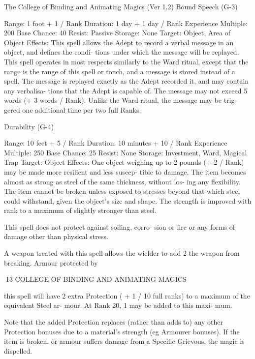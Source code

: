 \begin{Chapter}{The College of Binding and Animating Magics (Ver 1.2)}
Bound Speech (G-3) 

Range: 1 foot + 1 / Rank 
Duration: 1 day + 1 day / Rank 
Experience Multiple: 200 
Base Chance: 40%
Resist: Passive 
Storage: None 
Target: Object, Area of Object 
Effects:  This  spell  allows  the  Adept  to  record  a 
verbal message in an object, and defines the condi-
tions  under  which  the  message  will  be  replayed. 
This spell operates in most respects similarly to the 
Ward  ritual,  except  that  the  range  is  the  range  of 
this spell or touch, and a message is stored instead 
of  a  spell.  The  message  is  replayed  exactly  as  the 
Adept  recorded  it,  and  may  contain any  verbalisa-
tions  that  the  Adept  is  capable  of.  The  message 
may  not  exceed  5  words  (+  3  words  /  Rank). 
Unlike  the  Ward  ritual,  the  message  may  be  trig-
gered one additional time per two full Ranks. 

Durability (G-4) 

Range: 10 feet + 5 / Rank 
Duration: 10 minutes + 10 / Rank 
Experience Multiple: 250 
Base Chance: 25%
Resist: None 
Storage: Investment, Ward, Magical Trap 
Target: Object 
Effects: One object weighing up to 2 pounds (+ 2 / 
Rank) may be made more resilient and less suscep-
tible  to  damage.  The  item  becomes  almost  as 
strong  as  steel  of  the  same  thickness,  without  los-
ing  any  flexibility.  The  item  cannot  be  broken 
unless exposed to stresses beyond that which steel 
could withstand, given the object’s size and shape. 
The strength is improved with rank to a maximum 
of slightly stronger than steel. 

This  spell  does  not  protect  against  soiling,  corro-
sion  or  fire  or  any  forms  of  damage  other  than 
physical stress. 

A weapon treated with this spell allows the wielder 
to add 2%
the  weapon  from  breaking.  Armour  protected  by 

13 COLLEGE OF BINDING AND ANIMATING MAGICS 

this spell will have 2 extra Protection ( + 1 / 10 full 
ranks)  to  a  maximum  of  the  equivalent  Steel  ar-
mour.  At  Rank  20,  1  may  be  added  to  this  maxi-
mum. 

Note that the added Protection replaces (rather than 
adds  to)  any  other  Protection  bonuses  due  to  a 
material’s  strength  (eg  Armourer  bonuses).  If  the 
item  is  broken,  or  armour  suffers  damage  from  a 
Specific Grievous, the magic is dispelled. 


\end{Chapter}
